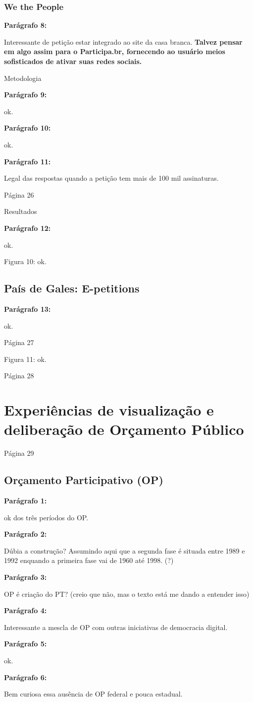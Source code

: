 \documentclass[12pt]{report}
\newcommand{\pp}[1]{

\textbf{Parágrafo #1:}

}
\begin{document}
\subsubsection{We the People}

\pp{8} Interessante de petição estar integrado ao site da casa branca. {\bf \color{red} Talvez pensar em algo assim para o Participa.br, fornecendo ao usuário meios sofisticados de ativar suas redes sociais.}

Metodologia

\pp{9} ok.

\pp{10} ok.

\pp{11} Legal das respostas quando a petição tem mais de 100 mil assinaturas.

\noindent Página 26

Resultados

\pp{12} ok.

Figura 10: ok.

\subsection{País de Gales: E-petitions}

\pp{13} ok.

\noindent Página 27

Figura 11: ok.

\noindent Página 28

\section{Experiências de visualização e deliberação de Orçamento Público}

\noindent Página 29

\subsection{Orçamento Participativo (OP)}

\pp{1} ok dos três períodos do OP.

\pp{2} Dúbia a construção? Assumindo aqui que a segunda fase é situada entre 1989 e 1992 enquando a primeira fase vai de 1960 até 1998. (?)

\pp{3} OP é criação do PT? (creio que não, mas o texto está me dando a entender isso)

\pp{4} Interessante a mescla de OP com outras iniciativas de democracia digital.

\pp{5} ok.

\pp{6} Bem curiosa essa ausência de OP federal e pouca estadual.
\end{document}
